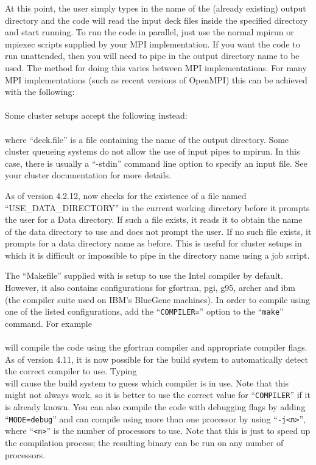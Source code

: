 At this point, the user simply types in the name of the (already existing)
output directory and the code will read the input deck files inside the
specified directory and start running. To run the code in parallel, just use
the normal mpirun or mpiexec scripts supplied by your MPI implementation. If
you want the code to run unattended, then you will need to pipe in the
output directory name to be used. The method for doing this varies between MPI
implementations. For many MPI implementations (such as recent versions of
OpenMPI) this can be achieved with the following:\\
\indent{}\\
Some cluster setups accept the following instead:\\
\indent{}\\
where ``deck.file'' is a file containing the name of the output directory.
Some cluster queueing systems do not
allow the use of input pipes to mpirun. In this case, there is usually a
``-stdin'' command line option to specify an input file. See your cluster
documentation for more details.

As of version 4.2.12, {\EPOCH} now checks for the existence of a file named
``USE\_DATA\_DIRECTORY'' in the current working directory before it prompts
the user for a Data directory. If such a file exists, it reads it to obtain the
name of the data directory to use and does not prompt the user. If no such file
exists, it prompts for a data directory name as before.
This is useful for cluster setups in which it is difficult or
impossible to pipe in the directory name using a job script.

The ``Makefile'' supplied with {\EPOCH} is setup to use the Intel compiler
by default. However, it also contains configurations for gfortran, pgi, g95,
archer and ibm (the compiler suite used on IBM's BlueGene machines).
In order to compile using one of the listed configurations, add the
``\verb|COMPILER=|'' option to the ``\verb|make|'' command. For example\\
\indent{}\\
will compile the code using the gfortran compiler and appropriate compiler
flags.
As of version 4.11, it is now possible for the build system to automatically
detect the correct compiler to use. Typing
\indent{}\\
will cause the build system to guess which compiler is in use. Note that this
might not always work, so it is better to use the correct value for
``\verb|COMPILER|'' if it is already known.
You can also compile the code with debugging flags by adding
``\verb|MODE=debug|'' and can compile using more than one processor by
using ``\verb|-j<n>|'', where ``\verb|<n>|''
is the number of processors to use. Note that this is just to speed up the
compilation process; the resulting binary can be run on any number of
processors.

